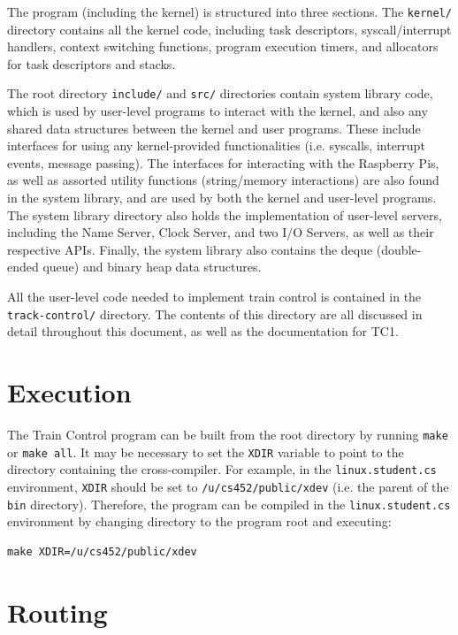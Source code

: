 \documentclass[12pt, titlepage]{article}
\begin{document}
    The program (including the kernel) is structured into three sections. The \verb`kernel/` directory contains all the kernel code, including task descriptors, syscall/interrupt handlers, context switching functions, program execution timers, and allocators for task descriptors and stacks.

    The root directory \verb`include/` and \verb`src/` directories contain system library code, which is used by user-level programs to interact with the kernel, and also any shared data structures between the kernel and user programs. These include interfaces for using any kernel-provided functionalities (i.e. syscalls, interrupt events, message passing). The interfaces for interacting with the Raspberry Pis, as well as assorted utility functions (string/memory interactions) are also found in the system library, and are used by both the kernel and user-level programs. The system library directory also holds the implementation of user-level servers, including the Name Server, Clock Server, and two I/O Servers, as well as their respective APIs. Finally, the system library also contains the deque (double-ended queue) and binary heap data structures.

    All the user-level code needed to implement train control is contained in the \verb`track-control/` directory. The contents of this directory are all discussed in detail throughout this document, as well as the documentation for TC1.

    \section{Execution}

    The Train Control program can be built from the root directory by running \verb`make` or \verb`make all`. It may be necessary to set the \verb`XDIR` variable to point to the directory containing the cross-compiler. For example, in the \verb`linux.student.cs` environment, \verb`XDIR` should be set to \verb`/u/cs452/public/xdev` (i.e. the parent of the \verb`bin` directory). Therefore, the program can be compiled in the \verb`linux.student.cs` environment by changing directory to the program root and executing:
    \begin{verbatim}
make XDIR=/u/cs452/public/xdev
    \end{verbatim}
    
    \section{Routing}
    \label{sec:routing}
    
\end{document}

